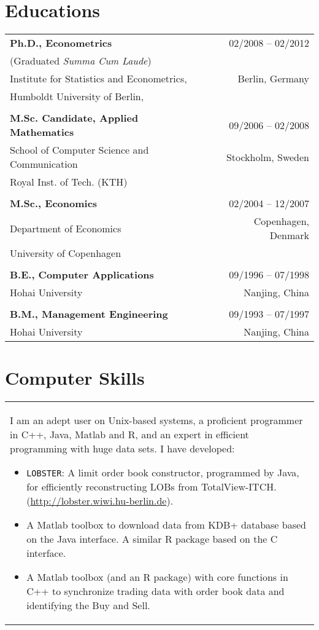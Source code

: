 \documentclass[a4paper,11pt]{article}
\begin{document}
\section*{Educations}
\noindent\hspace{20pt}
\begin{tabular}[h]{p{}r}
  \textbf{Ph.D., Econometrics} & 02/2008 -- 02/2012 \\
  (Graduated \emph{Summa Cum Laude}) &\\
  Institute for Statistics and Econometrics, &  Berlin, Germany\\
  Humboldt University of Berlin, & \hspace*{0.3\textwidth}\\
  &\\
  \textbf{M.Sc. Candidate, Applied Mathematics} & 09/2006 -- 02/2008 \\
  School of Computer Science and Communication & Stockholm, Sweden \\
  Royal Inst. of Tech. (KTH)& \\
 &\\
  \textbf{M.Sc., Economics} & 02/2004 -- 12/2007 \\
  Department of Economics & Copenhagen, Denmark  \\
  University of Copenhagen& \\
 &\\
  \textbf{B.E., Computer Applications} & 09/1996 -- 07/1998 \\
  Hohai University & Nanjing, China  \\
 &\\
  \textbf{B.M., Management Engineering} & 09/1993 -- 07/1997 \\
  Hohai University & Nanjing, China  \\
\end{tabular}
\newpage
\section*{Computer Skills}
\noindent\hspace{20pt} 
\begin{xtabular}[h]{p{\textwidth}}
I am an adept user on Unix-based systems, a proficient programmer in C++, Java, Matlab and R,  and an expert in efficient programming with huge data sets. I have developed:
\begin{itemize}
  \item \texttt{LOBSTER}: A limit order book constructor, programmed by Java, for efficiently reconstructing LOBs from TotalView-ITCH. (\url{http://lobster.wiwi.hu-berlin.de}).  
  \item A Matlab toolbox to download data from KDB+ database based on the Java interface. A similar R package based on the C interface.
  \item A Matlab toolbox (and an R package) with core functions in C++ to synchronize trading data with order book data and identifying the Buy and Sell.
\end{itemize}
\end{xtabular}
\end{document}
